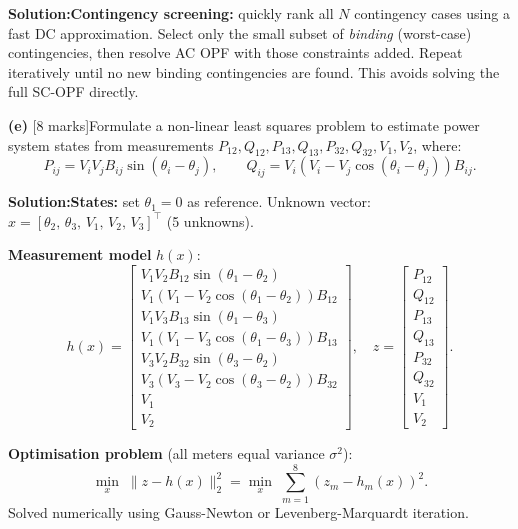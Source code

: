 \documentclass[10pt,a4paper]{article}
\newcommand{\Sol}{\par\vspace{4pt}\noindent\textbf{Solution:}\enspace}
\begin{document}
\Sol \textbf{Contingency screening:} quickly rank all $N$ contingency cases
using a fast DC approximation. Select only the small subset of
\textit{binding} (worst-case) contingencies, then resolve AC OPF with
those constraints added. Repeat iteratively until no new binding
contingencies are found. This avoids solving the full SC-OPF directly.

\vspace{4pt}
\noindent\textbf{(e)} [8 marks]\quad Formulate a non-linear least squares
problem to estimate power system states from measurements
$P_{12},Q_{12},P_{13},Q_{13},P_{32},Q_{32},V_1,V_2$, where:
\[
  P_{ij} = V_iV_jB_{ij}\sin(\theta_i-\theta_j),\qquad
  Q_{ij} = V_i(V_i-V_j\cos(\theta_i-\theta_j))B_{ij}.
\]

\Sol \textbf{States:} set $\theta_1=0$ as reference. Unknown vector:
$x = [\theta_2,\,\theta_3,\,V_1,\,V_2,\,V_3]^\top$ (5 unknowns).

\textbf{Measurement model} $h(x)$:
\[
  h(x) = \begin{bmatrix}
    V_1V_2B_{12}\sin(\theta_1-\theta_2)\\
    V_1(V_1-V_2\cos(\theta_1-\theta_2))B_{12}\\
    V_1V_3B_{13}\sin(\theta_1-\theta_3)\\
    V_1(V_1-V_3\cos(\theta_1-\theta_3))B_{13}\\
    V_3V_2B_{32}\sin(\theta_3-\theta_2)\\
    V_3(V_3-V_2\cos(\theta_3-\theta_2))B_{32}\\
    V_1\\ V_2
  \end{bmatrix},\quad
  z = \begin{bmatrix}P_{12}\\Q_{12}\\P_{13}\\Q_{13}\\P_{32}\\Q_{32}\\V_1\\V_2\end{bmatrix}.
\]

\textbf{Optimisation problem} (all meters equal variance $\sigma^2$):
\[
  \min_{x}\; \|z - h(x)\|_2^2
  = \min_{x}\;\sum_{m=1}^{8}(z_m - h_m(x))^2.
\]
Solved numerically using Gauss-Newton or Levenberg-Marquardt iteration.
\end{document}
